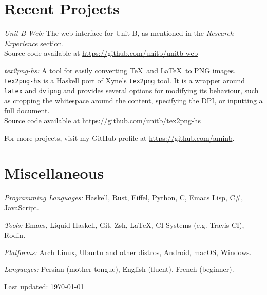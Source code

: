 \documentclass[12pt,letterpaper]{article}
\renewenvironment{itemize}{
  \begin{list}{}{
    \setlength{\leftmargin}{1.5em}
    \setlength{\itemsep}{0.25em}
    \setlength{\parskip}{0pt}
    \setlength{\parsep}{0.25em}
  }
}{
  \end{list}
}
\begin{document}
\section*{Recent Projects}

\begin{itemize}
\item \textit{Unit-B Web:} The web interface for Unit-B, as mentioned in the
  \textit{Research Experience} section.\\
  Source code available at
  \href{https://github.com/unitb/unitb-web}{https://github.com/unitb/unitb-web}

\item \textit{tex2png-hs:} A tool for easily converting \TeX\ and \LaTeX\ to PNG
  images. \verb#tex2png-hs# is a Haskell port of Xyne's \verb#tex2png# tool. It
  is a wrapper around \verb#latex# and \verb#dvipng# and provides several
  options for modifying its behaviour, such as cropping the whitespace around
  the content, specifying the DPI, or inputting a full document.\\
  Source code available at
  \href{https://github.com/unitb/tex2png-hs}{https://github.com/unitb/tex2png-hs}

\item For more projects, visit my GitHub profile at
  \href{https://github.com/aminb}{https://github.com/aminb}.
\end{itemize}

\section*{Miscellaneous}

\begin{itemize}
\item \textit{Programming Languages:} Haskell, Rust, Eiffel, Python, C, Emacs
  Lisp, C\#, JavaScript.
\item \textit{Tools:} Emacs, Liquid Haskell, Git, Zsh, \LaTeX, CI Systems
  (e.g. Travis CI), Rodin.
\item \textit{Platforms:} Arch Linux, Ubuntu and other distros, Android, macOS,
  Windows.
\item \textit{Languages:} Persian (mother tongue), English (fluent), French
  (beginner).
\end{itemize}


\bigskip
{\small Last updated: \today}
\end{document}
